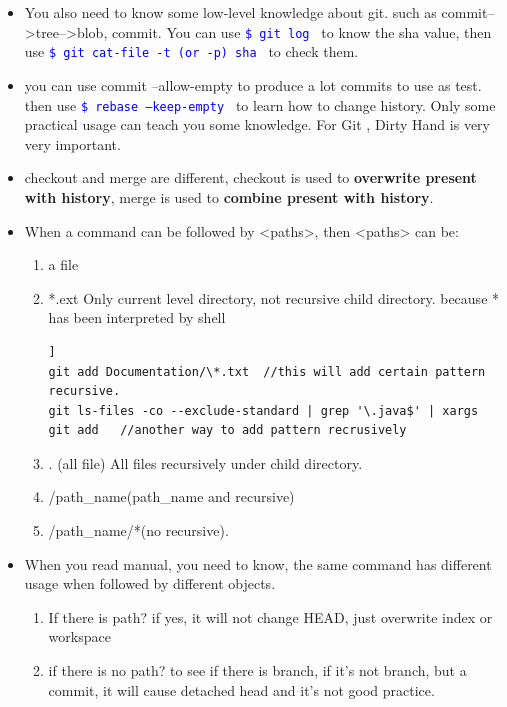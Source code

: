 \documentclass[a4paper,11pt,twoside]{book}
\newcommand{\linuxcommand}[1]{\texttt{\textcolor{blue}{\$ #1 \Pisymbol{psy}{191}}}}
\begin{document}
\begin{itemize}
	\item You also need to know some low-level knowledge about git. such as commit-->tree-->blob,  commit. You can use \linuxcommand{git log} to know the sha value, then use \linuxcommand{git cat-file -t (or -p) sha} to check them. 
	
	\item you can use commit --allow-empty to produce a lot commits to use as test. then use \linuxcommand{rebase --keep-empty } to learn how to change history. Only some practical usage can teach you some knowledge. For Git , Dirty Hand is very very important.
	
	\item checkout and merge are different, checkout is used to \textbf{overwrite present with history}, merge is used to \textbf{combine present with history}.  
	
	\item When a command can be followed by <paths>, then <paths> can be:
	\begin{enumerate}
		\item a file 
		\item *.ext  Only current level directory, not recursive child directory. because * has been interpreted by shell

\begin{lstlisting}[mathescape=false]]
git add Documentation/\*.txt  //this will add certain pattern recursive.
git ls-files -co --exclude-standard | grep '\.java$' | xargs git add   //another way to add pattern recrusively
\end{lstlisting}

			
		\item . (all file) All files recursively under child directory.
		\item /path\_name(path\_name and recursive) 
		\item /path\_name/*(no recursive). 
	\end{enumerate}
	
	\item When you read manual, you need to know, the same command has different usage when followed by different objects. 
\begin{enumerate}
	\item If there is path? if yes, it will not change HEAD, just overwrite index or workspace
	\item if there is no path?  to see if there is branch,  if it's not branch, but a commit,  it will cause detached head and it's not good practice. 
\end{enumerate}


\end{itemize}
\end{document}
